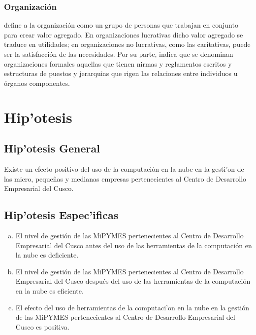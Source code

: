 \subsubsection{Organizaci\'on}
\cite{koontz} define a la organizaci\'on como un grupo de personas que trabajan en
conjunto para crear valor agregado. En organizaciones lucrativas dicho valor agregado
se traduce en utilidades; en organizaciones no lucrativas, como las caritativas,
puede ser la satisfacci\'on de las necesidades. Por su parte, \citep{chiavenato}
indica que se denominan organizaciones formales aquellas que tienen nirmas y reglamentos
escritos y estructuras de puestos y jerarquias que rigen las relaciones entre
individuos u \'organos componentes.

\section{Hip'otesis}

\subsection{Hip'otesis General}

Existe un efecto positivo del uso de la computaci\'on en la nube en la
gesti'on de las micro, peque\~nas y medianas empresas pertenecientes al Centro de
Desarrollo Empresarial del Cusco.

\subsection{Hip'otesis Espec'ificas}
\begin{enumerate}[a.]
    \item El nivel de gesti\'on de las MiPYMES pertenecientes al Centro de Desarrollo
          Empresarial del Cusco antes del uso de las herramientas de la computaci\'on
          en la nube es deficiente.
    \item El nivel de gesti\'on de las MiPYMES pertenecientes al Centro de Desarrollo
          Empresarial del Cusco despu\'es del uso de las herramientas de la computaci\'on
          en la nube es eficiente.
    \item El efecto del uso de herramientas de la computaci'on en la nube en la
          gesti\'on de las MiPYMES pertenecientes al Centro de Desarrollo Empresarial
          del Cusco es positiva.
\end{enumerate}

